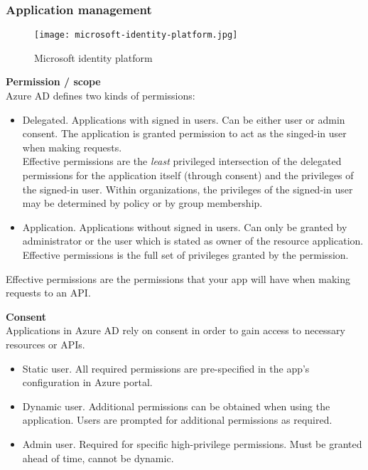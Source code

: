 \subsubsection{Application management}
\begin{figure}[!h]
\texttt{[image: microsoft-identity-platform.jpg]}
\caption{Microsoft identity platform}
\end{figure}

\textbf{Permission / scope} \\
Azure AD defines two kinds of permissions:
\begin{itemize}
\item Delegated. Applications with signed in users. Can be either user or admin consent. The application is granted permission to act as the singed-in user when making requests. \\ Effective permissions are the \textit{least} privileged intersection of the delegated permissions for the application itself (through consent) and the privileges of the signed-in user. Within organizations, the privileges of the signed-in user may be determined by policy or by group membership.
\item Application. Applications without signed in users. Can only be granted by administrator or the user which is stated as owner of the resource application. \\ Effective permissions is the full set of privileges granted by the permission.
\end{itemize}
Effective permissions are the permissions that your app will have when making requests to an API.

\textbf{Consent} \\
Applications in Azure AD rely on consent in order to gain access to necessary resources or APIs.
\begin{itemize}
\item Static user. All required permissions are pre-specified in the app's configuration in Azure portal.
\item Dynamic user. Additional permissions can be obtained when using the application. Users are prompted for additional permissions as required.
\item Admin user. Required for specific high-privilege permissions. Must be granted ahead of time, cannot be dynamic. 
\end{itemize}

